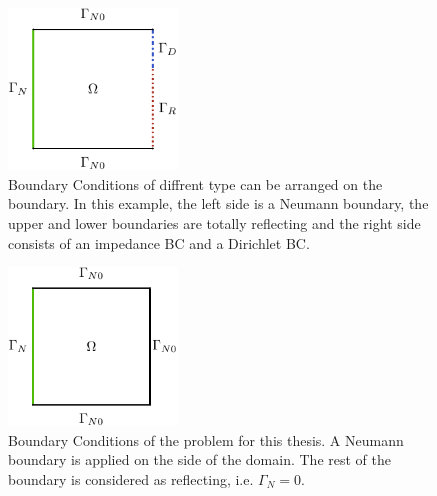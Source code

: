 \documentclass[%
  a4paper,oneside,%
  11pt,%
  smallchapters,
  green,%
  rgb, <cmyk>
  ]{tubsbook}
\begin{document}
\begin{figure}[h]
\begin{center}
\includegraphics[width=0.4\textwidth]{pics/BCsExample}
\caption{Boundary Conditions of diffrent type can be arranged on the boundary. In this example, the left side is a Neumann boundary, the upper and lower boundaries are totally reflecting and the right side consists of an impedance BC and a Dirichlet BC.}
\label{fig:BCEx}
\end{center}
\end{figure}


\begin{figure}[h]
\begin{center}
\includegraphics[width=0.4\textwidth]{pics/BCsThesis1}
\caption{Boundary Conditions of the problem for this thesis. A Neumann boundary is applied on the side of the domain. The rest of the boundary is considered as reflecting, i.e. $\Gamma_N = 0$.}
\label{fig:BCTh}
\end{center}
\end{figure}
\end{document}

